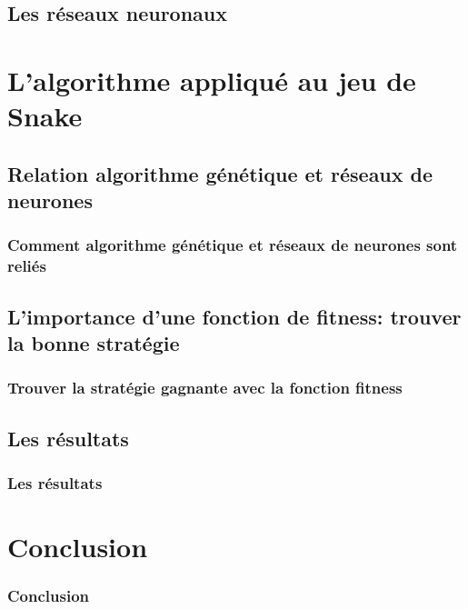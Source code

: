 \documentclass[10pt]{beamer}
\begin{document}
  \subsection{Les réseaux neuronaux}


\section{L'algorithme appliqué au jeu de Snake}

\subsection{Relation algorithme génétique et réseaux de neurones}

\begin{frame}
  \frametitle{Comment algorithme génétique et réseaux de neurones sont reliés}

\end{frame}

\subsection{L'importance d'une fonction de fitness: trouver la bonne stratégie}

\begin{frame}
  \frametitle{Trouver la stratégie gagnante avec la fonction fitness}
\end{frame}

\subsection{Les résultats}

\begin{frame}
  \frametitle{Les résultats}
\end{frame}

\section{Conclusion}

\begin{frame}
  \frametitle{Conclusion}
\end{frame}
\end{document}
